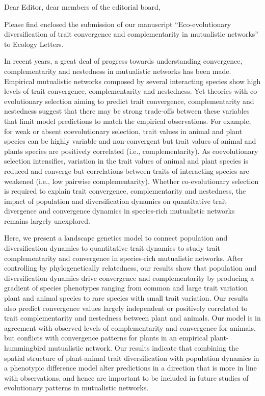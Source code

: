 \documentclass[pdftex]{nature}
\begin{document}
\parskip 6pt
\baselineskip 12pt
\noindent

\thispagestyle{empty}
Dear Editor, dear members of the editorial board, 
\vspace{0.1 in}

Please find enclosed the submission of our manuscript
``Eco-evolutionary diversification of trait convergence and
complementarity in mutualistic networks'' to Ecology Letters.

In recent years, a great deal of progress towards understanding
convergence, complementarity and nestedness in mutualistic networks has been
made. Empirical mutualistic networks composed by several interacting
species show high levels of trait convergence, complementarity and
nestedness. Yet theories with co-evolutionary selection aiming to
predict trait convergence, complementarity and nestedness suggest that
there may be strong trade-offs between these variables that limit model
predictions to match the empirical observations. For example, for weak
or absent coevolutionary selection, trait values in animal and plant
species can be highly variable and non-convergent but trait values of
animal and plants species are positively correlated (i.e.,
complementarity). As coevolutionary selection intensifies, variation
in the trait values of animal and plant species is reduced and
converge but correlations between traits of interacting species are
weakened (i.e., low pairwise complementarity). Whether co-evolutionary
selection is required to explain trait convergence, complementarity
and nestedness, the impact of population and diversification dynamics
on quantitative trait divergence and convergence dynamics in
species-rich mutualistic networks remains largely unexplored. 

Here, we present a landscape genetics model to connect population and
diversification dynamics to quantitative trait dynamics to study trait
complementarity and convergence in species-rich mutualistic
networks. After controlling by phylogenetically relatedness, our
results show that population and diversification dynamics drive
convergence and complementarity by producing a gradient of species
phenotypes ranging from common and large trait variation plant and
animal species to rare species with small trait variation. Our results
also predict convergence values largely independent or positively
correlated to trait complementarity and nestedness between plant and
animals. Our model is in agreement with observed levels of
complementarity and convergence for animals, but conflicts with
convergence patterns for plants in an empirical plant-hummingbird
mutualistic network. Our results indicate that combining the spatial
structure of plant-animal trait diversification with population
dynamics in a phenotypic difference model alter predictions in a
direction that is more in line with observations, and hence are
important to be included in future studies of evolutionary patterns in
mutualistic networks.
\end{document}
